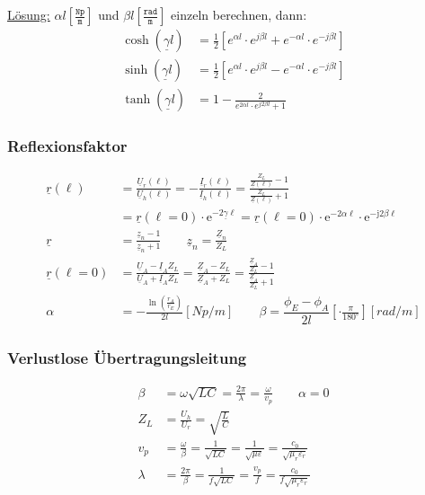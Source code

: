 \underline{Lösung:} $\alpha l \left[ \tfrac{\texttt{Np}}{\texttt{m}} \right] $
und $ \beta l \left[ \tfrac{\texttt{rad}}{\texttt{m}} \right] $ einzeln
berechnen, dann:
\begin{align*}
	\cosh(\underline{\gamma}l)  & = \frac{1}{2} \left[e^{\alpha l} \cdot e^{j\beta l} + e^{-\alpha l} \cdot e^{-j\beta l} \right] \\
	\sinh (\underline{\gamma}l) & = \frac{1}{2} \left[e^{\alpha l} \cdot e^{j\beta l} - e^{-\alpha l} \cdot e^{-j\beta l} \right] \\
	\tanh(\underline{\gamma}l)  & =
	1-\frac{2}{e^{2\alpha l} \cdot e^{j2\beta l}+1}
\end{align*}

\subsubsection{Reflexionsfaktor}
\begin{align*}
    \underline{r}(\ell)     & = \frac{\underline{U}_r(\ell)}{\underline{U}_h(\ell)} = -\frac{\underline{I}_r(\ell)}{\underline{I}_h(\ell)} = \frac{\frac{Z_L}{\underline{Z}(\ell)}-1}{\frac{Z_L}{\underline{Z}(\ell)}+1}\\
                            & = \underline{r}(\ell=0) \cdot \mathrm{e}^{-2 \underline{\gamma} \ell}=\underline{r}(\ell=0) \cdot \mathrm{e}^{-2 \alpha \ell} \cdot \mathrm{e}^{-\mathrm{j} 2 \beta \ell}\\
    \underline{r}           & = \frac{\underline{z}_n-1}{\underline{z}_n+1} \qquad              \underline{z}_n=\frac{\underline{Z}_n}{Z_L}\\
    \underline{r}(\ell = 0) & = \frac{\underline{U}_A-\underline{I}_A Z_L}{\underline{U}_A + \underline{I}_A Z_L}=\frac{\underline{Z}_A-Z_L}{\underline{Z}_A+Z_L}=\frac{\frac{\underline{Z}_A}{Z_L}-1}{\frac{\underline{Z}_A}{Z_L}+1}\\
                    \alpha  & = -\frac{\ln(\frac{r_A}{r_E})}{2l} [\si{Np/m}]  \qquad  \beta = \dfrac{\phi_E -\phi_A}{2l} \left[\cdot\frac{\pi}{180^\circ}\right] [\si{rad/m}]
\end{align*}

\subsubsection{Verlustlose Übertragungsleitung }
\begin{align*}
    \beta              & = \omega\sqrt{LC} = \frac{2 \pi}{\lambda} = \frac{\omega}{v_p}\qquad \alpha = 0 \\
    Z_L                & =\frac{U_h}{U_r}       = \sqrt{\frac{L}{C}}                                                                          \\
    v_p                & = \frac{\omega}{\beta} = \frac{1}{\sqrt{LC}}= \frac{1}{\sqrt{\mu\varepsilon}}= \frac{c_0}{\sqrt{\mu_r\varepsilon_r}} \\
    \lambda            & = \frac{2\pi}{\beta}=\frac{1}{f\sqrt{LC}}= \frac{v_p}{f}= \frac{c_0}{f\sqrt{\mu_r\varepsilon_r}}
\end{align*}


